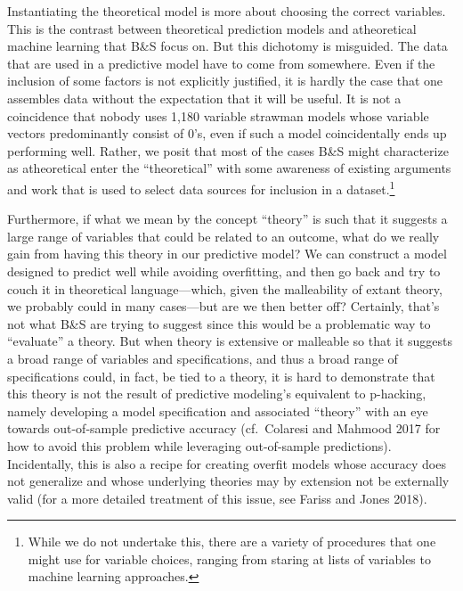 \documentclass[
]{article}
\begin{document}
Instantiating the theoretical model is more about choosing the correct variables. This is the contrast between theoretical prediction models and atheoretical machine learning that B\&S focus on. But this dichotomy is misguided. The data that are used in a predictive model have to come from somewhere. Even if the inclusion of some factors is not explicitly justified, it is hardly the case that one assembles data without the expectation that it will be useful. It is not a coincidence that nobody uses 1,180 variable strawman models whose variable vectors predominantly consist of 0's, even if such a model coincidentally ends up performing well. Rather, we posit that most of the cases B\&S might characterize as atheoretical enter the ``theoretical'' with some awareness of existing arguments and work that is used to select data sources for inclusion in a dataset.\footnote{While we do not undertake this, there are a variety of procedures that one might use for variable choices, ranging from staring at lists of variables to machine learning approaches.}

Furthermore, if what we mean by the concept ``theory'' is such that it suggests a large range of variables that could be related to an outcome, what do we really gain from having this theory in our predictive model? We can construct a model designed to predict well while avoiding overfitting, and then go back and try to couch it in theoretical language---which, given the malleability of extant theory, we probably could in many cases---but are we then better off? Certainly, that's not what B\&S are trying to suggest since this would be a problematic way to ``evaluate'' a theory. But when theory is extensive or malleable so that it suggests a broad range of variables and specifications, and thus a broad range of specifications could, in fact, be tied to a theory, it is hard to demonstrate that this theory is not the result of predictive modeling's equivalent to p-hacking, namely developing a model specification and associated ``theory'' with an eye towards out-of-sample predictive accuracy (cf.~Colaresi and Mahmood 2017 for how to avoid this problem while leveraging out-of-sample predictions). Incidentally, this is also a recipe for creating overfit models whose accuracy does not generalize and whose underlying theories may by extension not be externally valid (for a more detailed treatment of this issue, see Fariss and Jones 2018).
\end{document}
